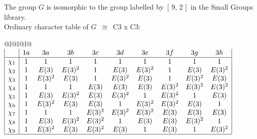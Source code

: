 \documentclass[varwidth=\maxdimen,border=10]{standalone}
\begin{document}
The group $G$ is isomorphic to the group labelled by\ [ 9, 2 ]\ in the Small Groups library.\\
Ordinary character table of $G$\ $\cong$\ C3 x C3:\\
\begin{center}
\begin{tabular}{@{}l@{}l@{}l@{}}
\hline
\(\begin{array}{|l|ccccccccc|}
  & 1a & 3a & 3b & 3c & 3d & 3e & 3f & 3g & 3h\\ \hline
\chi_{1} & 1 & 1 & 1 & 1 & 1 & 1 & 1 & 1 & 1\\
\chi_{2} & 1 & E(3) & E(3)^{2} & 1 & E(3) & E(3)^{2} & 1 & E(3) & E(3)^{2}\\
\chi_{3} & 1 & E(3)^{2} & E(3) & 1 & E(3)^{2} & E(3) & 1 & E(3)^{2} & E(3)\\
\chi_{4} & 1 & 1 & 1 & E(3) & E(3) & E(3) & E(3)^{2} & E(3)^{2} & E(3)^{2}\\
\chi_{5} & 1 & E(3) & E(3)^{2} & E(3) & E(3)^{2} & 1 & E(3)^{2} & 1 & E(3)\\
\chi_{6} & 1 & E(3)^{2} & E(3) & E(3) & 1 & E(3)^{2} & E(3)^{2} & E(3) & 1\\
\chi_{7} & 1 & 1 & 1 & E(3)^{2} & E(3)^{2} & E(3)^{2} & E(3) & E(3) & E(3)\\
\chi_{8} & 1 & E(3) & E(3)^{2} & E(3)^{2} & 1 & E(3) & E(3) & E(3)^{2} & 1\\
\chi_{9} & 1 & E(3)^{2} & E(3) & E(3)^{2} & E(3) & 1 & E(3) & 1 & E(3)^{2}\\
\hline
\end{array}\)\\
\end{tabular}
\end{center}
\end{document}
